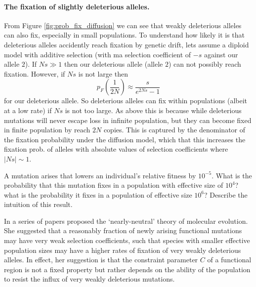 \paragraph{The fixation of slightly deleterious alleles.}
From Figure \ref{fig:prob_fix_diffusion} we can see that weakly
deleterious alleles can also fix, especially in small populations.  To understand how
likely it is that deleterious alleles accidently reach fixation by
genetic drift, lets assume a diploid model with additive selection
(with ma selection coefficient of $-s$ against our allele $2$).  
If $N s \gg 1$ then our deleterious allele (allele $2$) can not possibly reach
fixation. However, if $Ns$ is not large then
\begin{equation}
p_F \left( \frac{1}{2N} \right) \approx \frac{s}{e^{2Ns}-1} \label{eqn:fix_deleterious}
\end{equation}
for our deleterious allele. So deleterious alleles can fix within
populations (albeit at a low rate) if $Ns$ is not too large. As above
this is because while deleterious mutations will never escape loss in
infinite population, but they can become fixed in finite population by
reach $2N$ copies. This is captured by the denominator of the fixation
probability under the diffusion model, which that this increases the
fixation prob. of alleles with absolute values of selection
coefficients where $|Ns| \sim 1$.

\begin{question}
A mutation arises that lowers an individual’s relative fitness by
$10^{−5}$. What is the probability that this mutation fixes in a
population with effective size of $10^4$? what is the probability it
fixes in a population of effective size  $10^6$? Describe the
intuition of this result.
\end{question}

In a series of papers \citeauthor{ohta1973slightly}\cite{ohta1973slightly,ohta1987very}
proposed the `nearly-neutral' theory of
molecular evolution. She suggested that a reasonably fraction of newly
arising functional mutations may have very weak selection
coefficients, such that species with smaller effective population sizes may
have a higher rates of fixation of very weakly deleterious
alleles. In effect, her suggestion is that the constraint parameter
$C$ of a functional region is not a fixed property but rather depends
on the ability of the population to resist the influx of very weakly
deleterious mutations. 


